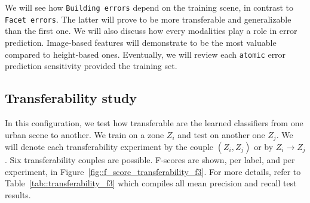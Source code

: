     We will see how \texttt{Building errors} depend on the training scene, in contrast to \texttt{Facet errors}.
    The latter will prove to be more transferable and generalizable than the first one.
    We will also discuss how every modalities play a role in error prediction.
    Image-based features will demonstrate to be the most valuable compared to height-based ones.
    Eventually, we will review each \texttt{atomic} error prediction sensitivity provided the training set.

    \subsection{Transferability study}
        \label{subsec::more_experiments::scalability::transferability}
        In this configuration, we test how transferable are the learned classifiers from one urban scene to another.
        We train on a zone $Z_i$ and test on another one $Z_j$.
        We will denote each transferability experiment by the couple $(Z_i, Z_j)$ or by $Z_i \rightarrow Z_j$.
        Six transferability couples are possible.
        F-scores are shown, per label, and per experiment, in Figure~\ref{fig::f_score_transferability_f3}.
        For more details, refer to Table~\ref{tab::transferability_f3} which compiles all mean precision and recall test results.\\
        
        \begin{figure}[htbp]
        \end{figure}

